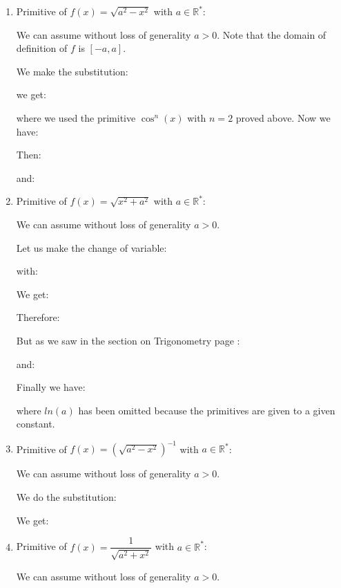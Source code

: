 \begin{enumerate}
		Therefore:
		
		and using another identity proved in the section Trigonometry:
		
		we have therefore:
		
		as the primitive are given to a given constant, we can write:
		
		for $x\geq a$. $F$ is then a primitive of $\sqrt{x^2-a^2}$ on the interval $[a,+\infty[$.
		
		\item Primitive of $f(x)=\sqrt{a^2-x^2}$ with $a\in \mathbb{R}^*$:
		
		We can assume without loss of generality $a>0$. Note that the domain of definition of $f$ is $[-a, a]$.
		
		We make the substitution:
		
		we get:
		
		where we used the primitive $\cos^n (x)$ with $n=2$ proved above. Now we have:
		
		Then:
		
		and:
		

		\item Primitive of $f(x)=\sqrt{x^2+a^2}$ with $a\in \mathbb{R}^*$:
		
		We can assume without loss of generality $a>0$.
		
		Let us make the change of variable:
		
		with:
		
		We get:
		
		Therefore:
		
		But as we saw in the section on Trigonometry page \pageref{hyperbolic trigonometry}:
		
		and:
		
		Finally we have:
		
		where $ln (a)$ has been omitted because the primitives are given to a given constant.
		
		\item Primitive of $f(x)=\left(\sqrt{a^2-x^2}\right)^{-1}$ with $a\in \mathbb{R}^*$:
		
		We can assume without loss of generality $a>0$.
		
		We do the substitution:
		
		We get:
		
		
		\item Primitive of $f(x)=\dfrac{1}{\sqrt{a^2+x^2}}$ with $a\in \mathbb{R}^*$:
		
		We can assume without loss of generality $a>0$.
		

\end{enumerate}
